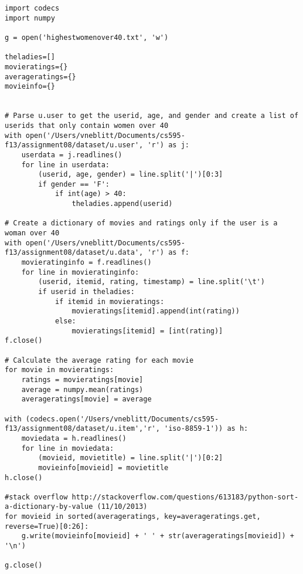 \documentclass{article}
\begin{document}
\begin{lstlisting}[frame=single, caption=highestwomenover40.py, label=highestwomenover40]
import codecs
import numpy

g = open('highestwomenover40.txt', 'w')

theladies=[]
movieratings={}
averageratings={}
movieinfo={}


# Parse u.user to get the userid, age, and gender and create a list of userids that only contain women over 40
with open('/Users/vneblitt/Documents/cs595-f13/assignment08/dataset/u.user', 'r') as j:
	userdata = j.readlines()
	for line in userdata:
		(userid, age, gender) = line.split('|')[0:3]
		if gender == 'F':
			if int(age) > 40:
				theladies.append(userid)

# Create a dictionary of movies and ratings only if the user is a woman over 40
with open('/Users/vneblitt/Documents/cs595-f13/assignment08/dataset/u.data', 'r') as f:
	movieratinginfo = f.readlines()
	for line in movieratinginfo:
		(userid, itemid, rating, timestamp) = line.split('\t')
		if userid in theladies:
			if itemid in movieratings:
				movieratings[itemid].append(int(rating))
			else:
				movieratings[itemid] = [int(rating)]
f.close()

# Calculate the average rating for each movie
for movie in movieratings:
	ratings = movieratings[movie]
	average = numpy.mean(ratings)
	averageratings[movie] = average

with (codecs.open('/Users/vneblitt/Documents/cs595-f13/assignment08/dataset/u.item','r', 'iso-8859-1')) as h:
	moviedata = h.readlines()
	for line in moviedata:
		(movieid, movietitle) = line.split('|')[0:2]
		movieinfo[movieid] = movietitle
h.close()

#stack overflow http://stackoverflow.com/questions/613183/python-sort-a-dictionary-by-value (11/10/2013)
for movieid in sorted(averageratings, key=averageratings.get, reverse=True)[0:26]:
	g.write(movieinfo[movieid] + ' ' + str(averageratings[movieid]) + '\n')

g.close()
\end{lstlisting}
\end{document}
